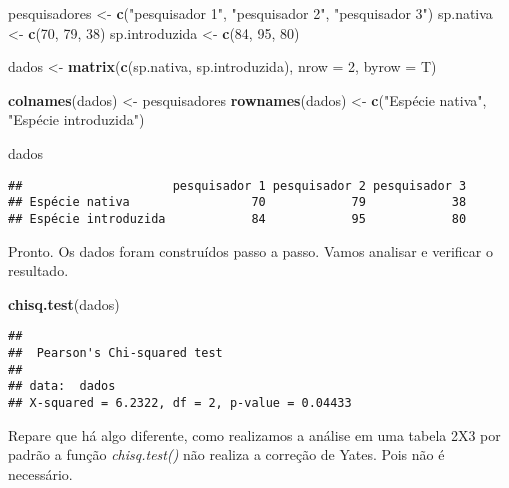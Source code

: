 \documentclass[titlepage, oneside, openany, a4paper]{book}
\newenvironment{Shaded}{\begin{snugshade}}{\end{snugshade}}
\newcommand{\DataTypeTok}[1]{\textcolor[rgb]{0.13,0.29,0.53}{#1}}
\newcommand{\DecValTok}[1]{\textcolor[rgb]{0.00,0.00,0.81}{#1}}
\newcommand{\KeywordTok}[1]{\textcolor[rgb]{0.13,0.29,0.53}{\textbf{#1}}}
\newcommand{\NormalTok}[1]{#1}
\newcommand{\StringTok}[1]{\textcolor[rgb]{0.31,0.60,0.02}{#1}}
\begin{document}
\begin{Shaded}
\begin{Highlighting}[]
\NormalTok{pesquisadores <-}\StringTok{ }\KeywordTok{c}\NormalTok{(}\StringTok{"pesquisador 1"}\NormalTok{, }\StringTok{"pesquisador 2"}\NormalTok{, }\StringTok{"pesquisador 3"}\NormalTok{)}
\NormalTok{sp.nativa <-}\StringTok{ }\KeywordTok{c}\NormalTok{(}\DecValTok{70}\NormalTok{, }\DecValTok{79}\NormalTok{, }\DecValTok{38}\NormalTok{)}
\NormalTok{sp.introduzida <-}\StringTok{ }\KeywordTok{c}\NormalTok{(}\DecValTok{84}\NormalTok{, }\DecValTok{95}\NormalTok{, }\DecValTok{80}\NormalTok{)}

\NormalTok{dados <-}\StringTok{ }\KeywordTok{matrix}\NormalTok{(}\KeywordTok{c}\NormalTok{(sp.nativa, sp.introduzida), }\DataTypeTok{nrow =} \DecValTok{2}\NormalTok{, }\DataTypeTok{byrow =}\NormalTok{ T)}

\KeywordTok{colnames}\NormalTok{(dados) <-}\StringTok{ }\NormalTok{pesquisadores}
\KeywordTok{rownames}\NormalTok{(dados) <-}\StringTok{ }\KeywordTok{c}\NormalTok{(}\StringTok{"Espécie nativa"}\NormalTok{, }\StringTok{"Espécie introduzida"}\NormalTok{)}

\NormalTok{dados}
\end{Highlighting}
\end{Shaded}

\begin{verbatim}
##                     pesquisador 1 pesquisador 2 pesquisador 3
## Espécie nativa                 70            79            38
## Espécie introduzida            84            95            80
\end{verbatim}

Pronto. Os dados foram construídos passo a passo. Vamos analisar e verificar o resultado.

\begin{Shaded}
\begin{Highlighting}[]
\KeywordTok{chisq.test}\NormalTok{(dados)}
\end{Highlighting}
\end{Shaded}

\begin{verbatim}
## 
##  Pearson's Chi-squared test
## 
## data:  dados
## X-squared = 6.2322, df = 2, p-value = 0.04433
\end{verbatim}

Repare que há algo diferente, como realizamos a análise em uma tabela 2X3 por padrão a função \emph{chisq.test()} não realiza a correção de Yates. Pois não é necessário.
\end{document}
